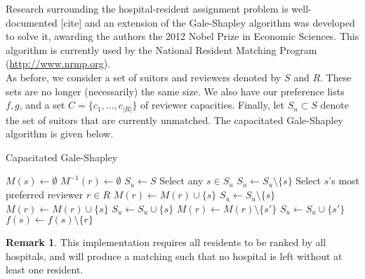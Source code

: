 \documentclass{article}
\theoremstyle{definition}
\newtheorem*{remark}{Remark}
\begin{document}
Research surrounding the hospital-resident assignment problem is well-documented 
[cite] and an extension of the Gale-Shapley algorithm was developed to solve it,
awarding the authors the 2012 Nobel Prize in Economic Sciences. This algorithm
is currently used by the National Resident Matching Program 
(\url{http://www.nrmp.org}). \\

As before, we consider a set of suitors and reviewers denoted by \(S\) and 
\(R\). These sets are no longer (necessarily) the same size. We also have our 
preference lists \(f, g\), and a set \(C = \{c_1, \ldots, c_{|R|}\}\) of 
reviewer capacities. Finally, let \(S_u \subset S\) denote the set of suitors 
that are currently unmatched. The capacitated Gale-Shapley algorithm is given 
below.

\begin{algorithm}[H]
\caption{Capacitated Gale-Shapley}\label{alg:cap-galeshapley}
    \begin{algorithmic}[0]
            \State \(M(s) \gets \emptyset\)
	    \EndFor
            \State \(M^{-1}(r) \gets \emptyset\)
	    \EndFor
        \State \(S_u \gets S\)
            \State Select any \(s \in S_u\)
                \State \(S_u \gets S_u \setminus \{s\}\)
		    \Else
                \State Select \(s\)'s most preferred reviewer \(r \in R\)
                    \State \(M(r) \gets M(r) \cup \{s\}\)
                    \State \(S_u \gets S_u \setminus \{s\}\)
		        \Else
                                \State \(M(r) \gets M(r) \cup \{s\}\)
                                \State \(S_u \gets S_u \cup \{s\}\)
                                \State \(M(r) \gets M(r) \setminus \{s'\}\)
                                \State \(S_u \gets S_u \cup \{s'\}\)
				            \Else
                                \State \(f(s) \gets f(s) \setminus \{r\}\)
				            \EndIf
			            \EndIf
			        \EndFor
		        \EndIf
		    \EndIf
	    \EndWhile
	\end{algorithmic}
\end{algorithm}

\begin{remark}
	This implementation requires all residents to be ranked by all hospitals, 
    and will produce a matching such that no hospital is left without at least 
    one resident.
\end{remark}
\end{document}
